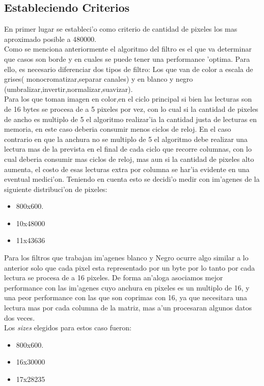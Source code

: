 \subsection{Estableciendo Criterios}
En primer lugar se estableci'o como criterio de cantidad de pixeles los mas aproximado posible
a 480000.\\
Como se menciona anteriormente el algoritmo del filtro es el que va determinar que casos son borde
y en cuales se puede tener una performance 'optima. Para ello, es necesario diferenciar  dos tipos de
filtro: Los que van de color a escala de grises( monocromatizar,separar canales) y en blanco y negro
(umbralizar,invertir,normalizar,suavizar). \\
Para los que toman imagen en color,en el ciclo principal si bien las lecturas son de 16 bytes se procesa 
de a 5 pixeles por vez, con lo cual si la cantidad de pixeles de ancho es multiplo de 5 el algoritmo 
realizar'ia la cantidad justa de lecturas en memoria, en este caso deberia consumir menos
ciclos de reloj. 
En el caso contrario en que la anchura no se multiplo de 5 el algoritmo debe realizar una lectura
mas de la prevista en el final de cada ciclo que recorre columnas, con lo cual deberia consumir
mas ciclos de reloj, mas aun si la cantidad de pixeles alto aumenta, el costo de esas lecturas extra por 
columna se har'ia evidente en una eventual medici'on.
Teniendo en cuenta esto se decidi'o medir con im'agenes de la siguiente distribuci'on de pixeles:
 \begin{itemize}
 \item{800x600}.
 \item{10x48000}
 \item{11x43636}
\end{itemize}
Para los filtros que trabajan im'agenes blanco y Negro ocurre algo similar a lo anterior solo que cada
pixel esta representado por un byte por lo tanto por cada lectura se procesa de a 16 pixeles. De forma
an'aloga asociamos mejor performance con las im'agenes cuyo anchura en pixeles es un multiplo de 16, y 
una peor performance con las que son coprimas con 16, ya que necesitara una lectura mas por cada columna
de la matriz, mas a'un procesaran algunos datos dos veces. \\
Los \textit{sizes} elegidos para estos caso fueron:\\
\begin{itemize}
 \item{800x600}.
 \item{16x30000}
 \item{17x28235}
\end{itemize}
